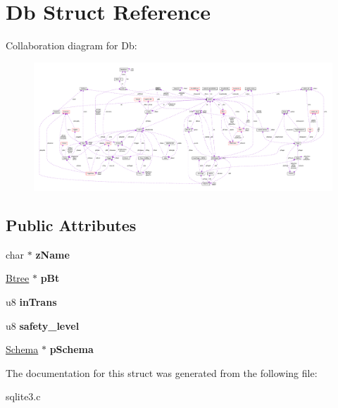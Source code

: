 \hypertarget{struct_db}{\section{Db Struct Reference}
\label{struct_db}
}


Collaboration diagram for Db\-:\nopagebreak
\begin{figure}[H]
\begin{center}
\leavevmode
\includegraphics[width=350pt]{struct_db__coll__graph}
\end{center}
\end{figure}
\subsection*{Public Attributes}
\begin{DoxyCompactItemize}
\item 
\hypertarget{struct_db_a6df2b5d7c8fd68e92cea961d9e3b279b}{char $\ast$ {\bfseries z\-Name}}\label{struct_db_a6df2b5d7c8fd68e92cea961d9e3b279b}

\item 
\hypertarget{struct_db_a0633e5a6abfc39246d07cc6a417a5852}{\hyperlink{struct_btree}{Btree} $\ast$ {\bfseries p\-Bt}}\label{struct_db_a0633e5a6abfc39246d07cc6a417a5852}

\item 
\hypertarget{struct_db_a4c5495ebea317212f0b41aa2795a7bc9}{u8 {\bfseries in\-Trans}}\label{struct_db_a4c5495ebea317212f0b41aa2795a7bc9}

\item 
\hypertarget{struct_db_a04597a5c023d8b328193450b177ff24c}{u8 {\bfseries safety\-\_\-level}}\label{struct_db_a04597a5c023d8b328193450b177ff24c}

\item 
\hypertarget{struct_db_afd8647a83a4a7053231b92814520d6d4}{\hyperlink{struct_schema}{Schema} $\ast$ {\bfseries p\-Schema}}\label{struct_db_afd8647a83a4a7053231b92814520d6d4}

\end{DoxyCompactItemize}


The documentation for this struct was generated from the following file\-:\begin{DoxyCompactItemize}
\item 
sqlite3.\-c\end{DoxyCompactItemize}
